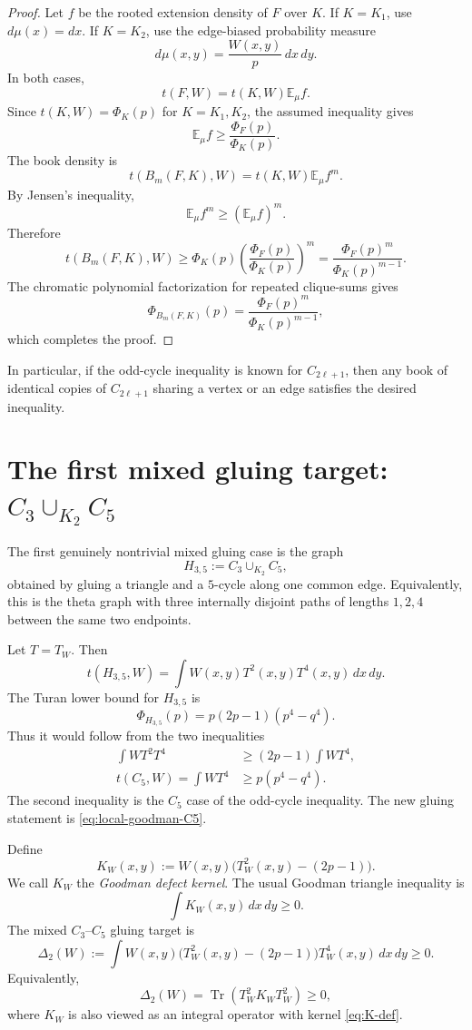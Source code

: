 \documentclass[11pt]{article}
\theoremstyle{definition}
\newcommand{\E}{\mathbb E}
\newcommand{\Tr}{\operatorname{Tr}}
\begin{document}
\begin{proof}
Let $f$ be the rooted extension density of $F$ over $K$.  If $K=K_1$, use $d\mu(x)=dx$.  If $K=K_2$, use the edge-biased probability measure
\[
  d\mu(x,y)=\frac{W(x,y)}{p}\,dx\,dy.
\]
In both cases,
\[
  t(F,W)=t(K,W)\E_\mu f.
\]
Since $t(K,W)=\Phi_K(p)$ for $K=K_1,K_2$, the assumed inequality gives
\[
  \E_\mu f\ge \frac{\Phi_F(p)}{\Phi_K(p)}.
\]
The book density is
\[
  t(B_m(F,K),W)=t(K,W)\E_\mu f^m.
\]
By Jensen's inequality,
\[
  \E_\mu f^m\ge (\E_\mu f)^m.
\]
Therefore
\[
  t(B_m(F,K),W)
  \ge \Phi_K(p)\left(\frac{\Phi_F(p)}{\Phi_K(p)}\right)^m
  =\frac{\Phi_F(p)^m}{\Phi_K(p)^{m-1}}.
\]
The chromatic polynomial factorization for repeated clique-sums gives
\[
  \Phi_{B_m(F,K)}(p)=\frac{\Phi_F(p)^m}{\Phi_K(p)^{m-1}},
\]
which completes the proof.
\end{proof}

In particular, if the odd-cycle inequality is known for $C_{2\ell+1}$, then any book of identical copies of $C_{2\ell+1}$ sharing a vertex or an edge satisfies the desired inequality.

\section{The first mixed gluing target: $C_3\cup_{K_2}C_5$}

The first genuinely nontrivial mixed gluing case is the graph
\[
  H_{3,5}:=C_3\cup_{K_2}C_5,
\]
obtained by gluing a triangle and a $5$-cycle along one common edge.  Equivalently, this is the theta graph with three internally disjoint paths of lengths $1,2,4$ between the same two endpoints.

Let $T=T_W$.  Then
\[
  t(H_{3,5},W)=\int W(x,y)T^2(x,y)T^4(x,y)\,dx\,dy.
\]
The Turan lower bound for $H_{3,5}$ is
\[
  \Phi_{H_{3,5}}(p)
  =p(2p-1)(p^4-q^4).
\]
Thus it would follow from the two inequalities
\begin{align}
  \int W T^2T^4 &\ge (2p-1)\int W T^4, \label{eq:local-goodman-C5}\\
  t(C_5,W)=\int W T^4 &\ge p(p^4-q^4). \label{eq:C5-ineq}
\end{align}
The second inequality is the $C_5$ case of the odd-cycle inequality.  The new gluing statement is \eqref{eq:local-goodman-C5}.

Define
\begin{equation}\label{eq:K-def}
  K_W(x,y):=W(x,y)\bigl(T_W^2(x,y)-(2p-1)\bigr).
\end{equation}
We call $K_W$ the \emph{Goodman defect kernel}.  The usual Goodman triangle inequality is
\[
  \int K_W(x,y)\,dx\,dy\ge0.
\]
The mixed $C_3$--$C_5$ gluing target is
\begin{equation}\label{eq:SG2}
  \Delta_2(W):=
  \int W(x,y)\bigl(T_W^2(x,y)-(2p-1)\bigr)T_W^4(x,y)\,dx\,dy\ge0.
\end{equation}
Equivalently,
\begin{equation}\label{eq:trace-SG2}
  \Delta_2(W)=\Tr(T_W^2K_WT_W^2)\ge0,
\end{equation}
where $K_W$ is also viewed as an integral operator with kernel \eqref{eq:K-def}.
\end{document}
